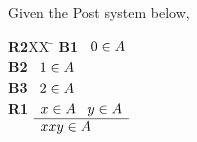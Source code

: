 \documentclass[addpoints]{exam}
\begin{document}
\begin{questions}
\question Given the Post system below, 
\begin{tabbing}
{\bf R2}XX \=  \kill
{\bf B1} \>
        \(\begin{array}[t]{l}
        0 \in A
        \end{array}\) \\[2ex]
{\bf B2} \>
        \(\begin{array}[t]{l}
        1 \in A
        \end{array}\) \\[2ex]
{\bf B3} \>
        \(\begin{array}[t]{l}
        2 \in A
        \end{array}\) \\[2ex]
{\bf R1} \>
        \(\begin{array}[t]{l}
        x \in A \; \; \; y \in A \\
        \hline
        xxy \in A
        \end{array}\) 
\end{tabbing}
\vspace{9.5cm}

%


\end{questions}
\end{document}
